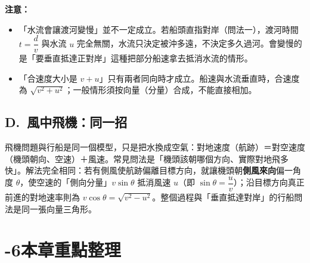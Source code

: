 \documentclass[11pt]{article}
\begin{document}

\textbf{注意：}
\begin{itemize}\setlength{\itemsep}{1pt}
\item 「水流會讓渡河變慢」並不一定成立。若船頭直指對岸（問法一），渡河時間 $t=\dfrac{d}{v}$ 與水流 $u$ 完全無關，水流只決定被沖多遠，不決定多久過河。會變慢的是「要垂直抵達正對岸」這種把部分船速拿去抵消水流的情形。
\item 「合速度大小是 $v+u$」只有兩者同向時才成立。船速與水流垂直時，合速度為 $\sqrt{v^2+u^2}$；一般情形須按向量（分量）合成，不能直接相加。
\end{itemize}

\subsection*{\sffamily D.\ 風中飛機：同一招}

飛機問題與行船是同一個模型，只是把水換成空氣：對地速度（航跡）＝對空速度（機頭朝向、空速）＋風速。常見問法是「機頭該朝哪個方向、實際對地飛多快」。解法完全相同：若有側風使航跡偏離目標方向，就讓機頭朝\textbf{側風來向}偏一角度 $\theta$，使空速的「側向分量」$v\sin\theta$ 抵消風速 $u$（即 $\sin\theta=\dfrac{u}{v}$）；沿目標方向真正前進的對地速率則為 $v\cos\theta=\sqrt{v^2-u^2}$。整個過程與「垂直抵達對岸」的行船問法是同一張向量三角形。

\section*{-6\quad 本章重點整理}
\end{document}
